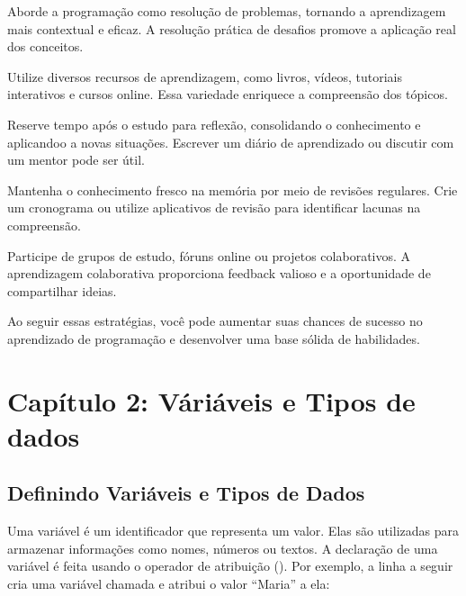 \documentclass[letterpaper,10pt,english]{jupyterBook}
\begin{document}
\sphinxAtStartPar
{}
Aborde a programação como resolução de problemas, tornando a aprendizagem mais contextual e eficaz. A resolução prática de desafios promove a aplicação real dos conceitos.

\sphinxAtStartPar
{}
Utilize diversos recursos de aprendizagem, como livros, vídeos, tutoriais interativos e cursos online. Essa variedade enriquece a compreensão dos tópicos.

\sphinxAtStartPar
{}
Reserve tempo após o estudo para reflexão, consolidando o conhecimento e aplicando\sphinxhyphen{}o a novas situações. Escrever um diário de aprendizado ou discutir com um mentor pode ser útil.

\sphinxAtStartPar
{}
Mantenha o conhecimento fresco na memória por meio de revisões regulares. Crie um cronograma ou utilize aplicativos de revisão para identificar lacunas na compreensão.

\sphinxAtStartPar
{}
Participe de grupos de estudo, fóruns online ou projetos colaborativos. A aprendizagem colaborativa proporciona feedback valioso e a oportunidade de compartilhar ideias.

\sphinxAtStartPar
Ao seguir essas estratégias, você pode aumentar suas chances de sucesso no aprendizado de programação e desenvolver uma base sólida de habilidades.

\sphinxstepscope


\chapter{Capítulo 2: Váriáveis e Tipos de dados}
\label{\detokenize{chapters/ch2/ch2:capitulo-2-variaveis-e-tipos-de-dados}}\label{\detokenize{chapters/ch2/ch2::doc}}

\section{Definindo Variáveis e Tipos de Dados}
\label{\detokenize{chapters/ch2/ch2:definindo-variaveis-e-tipos-de-dados}}
\sphinxAtStartPar
Uma variável é um identificador que representa um valor. Elas são utilizadas para armazenar informações como nomes, números ou textos. A declaração de uma variável é feita usando o operador de atribuição (\sphinxcode{\sphinxupquote{=}}). Por exemplo, a linha a seguir cria uma variável chamada  e atribui o valor “Maria” a ela:
\end{document}
